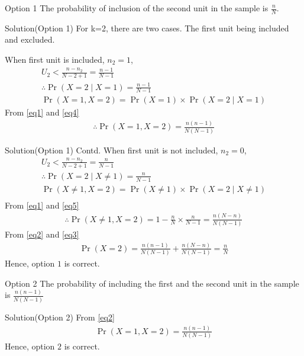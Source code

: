\documentclass{beamer}
\providecommand{\pr}[1]{\ensuremath{\Pr\left(#1\right)}}
\begin{document}
\begin{frame}{Option 1}
     The probability of inclusion of the second unit in the sample is $\frac{n}{N}$.
\end{frame}
\begin{frame}{Solution(Option 1)}
    For k=2, there are two cases. The first unit being included and excluded.
    
    When first unit is included, $n_2 = 1$,
    \begin{align}
        U_2 < \frac{n-n_2}{N-2+1} = \frac{n-1}{N-1} \\
        \therefore\pr{X=2 \mid X=1} = \frac{n-1}{N-1} \label{eq4}\\
        \pr{X=1, X=2} = \pr{X=1} \times \pr{X=2 \mid X=1}
    \end{align} 
From \eqref{eq1} and \eqref{eq4}
    \begin{align}   
        \therefore \pr{X=1, X=2} = \frac{n (n-1)}{N (N-1)} \label{eq2} 
    \end{align}
\end{frame}
\begin{frame}{Solution(Option 1) Contd.}
When first unit is not included, $n_2 = 0$,
    \begin{align}
        U_2 < \frac{n-n_2}{N-2+1} = \frac{n}{N-1}\\
        \therefore \pr{X=2 \mid X\neq 1} = \frac{n}{N-1}\label{eq5}\\
        \pr{X\neq1, X=2} = \pr{X\neq1} \times \pr{X=2 \mid X\neq1} \\
    \end{align} 
From \eqref{eq1} and \eqref{eq5}
    \begin{align}
        \therefore \pr{X\neq1,X=2} = 1-\frac{n}{N}\times\frac{n}{N-1} = \frac{n (N-n)}{N (N-1)} \label{eq3}
    \end{align}
From \eqref{eq2} and \eqref{eq3}
\begin{align}
    \pr{X=2} = \frac{n(n-1)}{N (N-1)} + \frac{n (N-n)}{N (N-1)} = \frac{n}{N}
\end{align}
    Hence, option $1$ is correct.
\end{frame}

\begin{frame}{Option 2}
   The probability of including the first and the second unit in the sample is $\frac{n(n-1)}{N(N-1)}$
\end{frame}
\begin{frame}{Solution(Option 2)}
From \eqref{eq2}
    \begin{align}
        \pr{X=1, X=2} = \frac{n (n-1)}{N (N-1)}
    \end{align}
    Hence, option $2$ is correct.
\end{frame}
\end{document}
